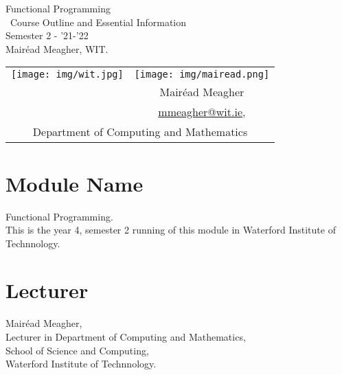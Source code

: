 \documentclass{article}
\author{Mair\'ead Meagher, WIT}
\newcommand\ExTitle{\ Course Outline and Essential Information}
\newcommand\fullExTitle{Functional Programming
\\ \ExTitle \\Semester 2 - '21-'22 }
\begin{document}
\begin{Huge}
	\begin{center}
	\fullExTitle \\
    \vspace{.1cm}
    Mair\'ead Meagher, WIT.
    \end{center}
\end{Huge}
\begin{center}
    \begin{tabular}{|c |  c | }
 
    \hline
    \texttt{[image: img/wit.jpg]} &          \texttt{[image: img/mairead.png]} \\ 

   
    
        & Mair\'ead Meagher  \\  
       & \href{mailto:mmeagher@wit.ie}{mmeagher@wit.ie}, \\

    \hline
    \multicolumn{2}{|c|}{Department of Computing and Mathematics} \\
     \hline

  
    \end{tabular}
\end{center}

\tableofcontents
\pagebreak
\section{Module Name}   
Functional Programming.  \\
This is the year 4, semester 2 running of this module in Waterford Institute of Technnology. 
\section{Lecturer}
Mair\'ead Meagher, \\
Lecturer in Department of Computing and Mathematics, \\
School of Science and Computing, \\
Waterford Institute of Technnology.
\end{document}
